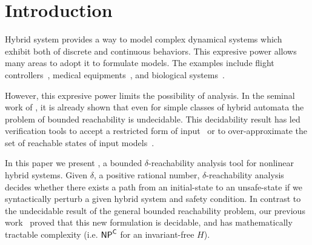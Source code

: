 \section{Introduction}


Hybrid system provides a way to model complex dynamical systems which
exhibit both of discrete and continuous behaviors.  This expresive
power allows many areas to adopt it to formulate models. The examples
include flight controllers~\cite{?}, medical equipments~\cite{?}, and
biological systems~\cite{?}.

However, this expresive power limits the possibility of analysis. In
the seminal work of
\cite{DBLP:conf/rex/AlurD91,DBLP:conf/hybrid/AlurCHH92}, it is already
shown that even for simple classes of hybrid automata the problem of
bounded reachability is undecidable. This decidability result has led
verification tools to accept a restricted form of input~\cite{?} or to
over-approximate the set of reachable states of input models~\cite{?}.

In this paper we present \dReach{}, a bounded $\delta$-reachability
analysis tool for nonlinear hybrid systems. Given $\delta$, a positive
rational number, $\delta$-reachability analysis decides whether there
exists a path from an initial-state to an unsafe-state if we
syntactically perturb a given hybrid system and safety condition.  In
contrast to the undecidable result of the general bounded reachability
problem, our previous work~\cite{DBLP:journals/corr/GaoKCC14} proved
that this new formulation is decidable, and has mathematically
tractable complexity (i.e. $\mathsf{NP}^{\mathsf{C}}$ for an invariant-free
$H$).

